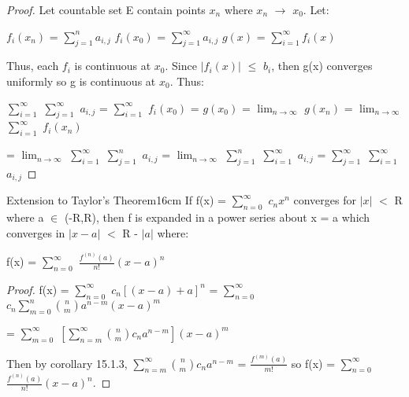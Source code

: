     \begin{proof}
        Let countable set E contain points $x_n$ where $x_n$ $\rightarrow$ $x_0$.
        Let:
        
        \hspace{0.5cm}
        $f_i(x_n)$ = $\sum_{j=1}^{n} a_{i,j}$
        \hspace{1cm}
        $f_i(x_0)$ = $\sum_{j=1}^{\infty} a_{i,j}$
        \hspace{1cm}
        $g(x)$ = $\sum_{i=1}^{\infty} f_i(x)$

        Thus, each $f_i$ is continuous at $x_0$.
        Since $|f_i(x)|$ $\leq$ $b_i$, then g(x) converges uniformly
        so g is continuous at $x_0$. Thus:

        \hspace{0.5cm}
        $\sum_{i=1}^{\infty}$ $\sum_{j=1}^{\infty}$ $a_{i,j}$
        = $\sum_{i=1}^{\infty}$ $f_i(x_0)$ = $g(x_0)$
        = $\lim_{n \rightarrow \infty}$ $g(x_n)$
        = $\lim_{n \rightarrow \infty}$ $\sum_{i=1}^{\infty}$ $f_i(x_n)$

        \hspace{0.5cm}
        = $\lim_{n \rightarrow \infty}$ $\sum_{i=1}^{\infty}$
            $\sum_{j=1}^{n}$ $a_{i,j}$
        = $\lim_{n \rightarrow \infty}$ $\sum_{j=1}^{n}$
            $\sum_{i=1}^{\infty}$ $a_{i,j}$
        = $\sum_{j=1}^{\infty}$ $\sum_{i=1}^{\infty}$ $a_{i,j}$
    \end{proof}

    \vspace{0.5cm}



    \begin{wtheorem}{Extension to Taylor's Theorem}{16cm}
        If f(x) = $\sum_{n=0}^{\infty}$ $c_nx^n$ converges for $|x|$ $<$ R
        where a $\in$ (-R,R), then f is expanded in a power series about x = a
        which converges in $|x-a|$ $<$ R - $|a|$ where:

        \hspace{0.5cm}
        f(x) = $\sum_{n=0}^{\infty}$ $\frac{f^{(n)}(a)}{n!}(x-a)^n$
    \end{wtheorem}

    \begin{proof}
        f(x)
        = $\sum_{n=0}^{\infty}$ $c_n[(x-a)+a]^n$
        = $\sum_{n=0}^{\infty}$ $c_n \sum_{m=0}^n \binom{n}{m} a^{n-m} (x-a)^m$

        \hspace{0.7cm}
        = $\sum_{m=0}^{\infty}$
            $[\sum_{n=m}^{\infty} \binom{n}{m} c_n a^{n-m}] (x-a)^m$ 

        Then by {\color{orange} corollary 15.1.3},
        $\sum_{n=m}^{\infty} \binom{n}{m} c_n a^{n-m}$
        = $\frac{f^{(m)}(a)}{m!}$
        so f(x) = $\sum_{n=0}^{\infty}$ $\frac{f^{(n)}(a)}{n!}(x-a)^n$.
    \end{proof}


